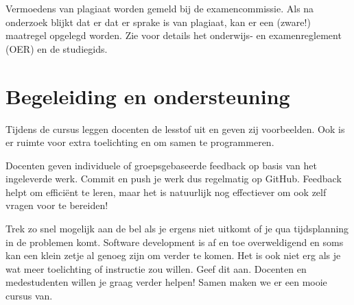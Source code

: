 Vermoedens van plagiaat worden gemeld bij de examencommissie. 
Als na onderzoek blijkt dat er dat er sprake is
van plagiaat, kan er een (zware!) maatregel opgelegd worden.
Zie voor details het onderwijs- en examenreglement (OER) en de studiegids.

\section{Begeleiding en ondersteuning}
Tijdens de cursus leggen docenten de lesstof uit en geven zij voorbeelden.
Ook is er ruimte voor extra toelichting en om samen te programmeren.

Docenten geven individuele of groepsgebaseerde feedback
op basis van het ingeleverde werk. Commit en push je werk dus regelmatig
op GitHub. Feedback helpt om efficiënt te leren, 
maar het is natuurlijk nog effectiever om ook zelf vragen voor te bereiden! 

Trek zo snel mogelijk aan de bel als je ergens niet uitkomt of 
je qua tijdsplanning in de problemen komt.
Software development is af en toe overweldigend en soms kan een 
klein zetje al genoeg zijn om verder te komen. Het is ook niet erg
als je wat meer toelichting of instructie zou willen. Geef dit aan.
Docenten en medestudenten willen je graag verder helpen!
Samen maken we er een mooie cursus van.